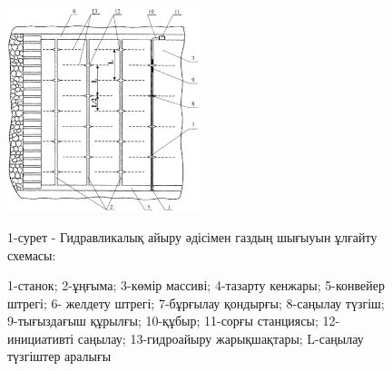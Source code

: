 \begin{figure}[H]
	\centering
	\includegraphics[width=0.5\textwidth]{assets/1133}
	\caption*{1-сурет - Гидравликалық айыру әдісімен газдың шығыуын ұлғайту схемасы:}
	\caption*{1-станок; 2-ұңғыма; 3-көмір массиві; 4-тазарту кенжары; 5-конвейер
штрегі; 6- желдету штрегі; 7-бұрғылау қондырғы; 8-саңылау түзгіш;
9-тығыздағыш құрылғы; 10-құбыр; 11-сорғы станциясы; 12-инициативті
саңылау; 13-гидроайыру жарықшақтары; L-саңылау түзгіштер аралығы}
\end{figure}

